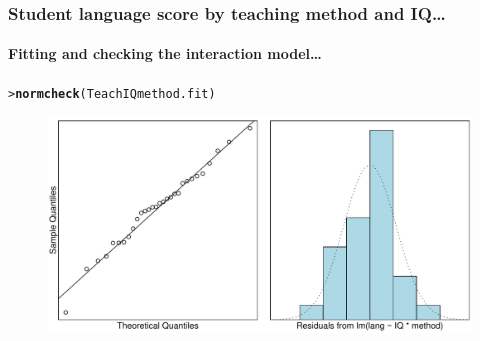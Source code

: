 \documentclass{beamer}\usepackage[]{graphicx}\usepackage[]{xcolor}
\makeatletter
\newcommand{\hlstd}[1]{\textcolor[rgb]{0.345,0.345,0.345}{#1}}%
\newcommand{\hlkwd}[1]{\textcolor[rgb]{0.737,0.353,0.396}{\textbf{#1}}}%
\newenvironment{kframe}{%
 \def\at@end@of@kframe{}%
 \ifinner\ifhmode%
  \def\at@end@of@kframe{\end{minipage}}%
  \begin{minipage}{\columnwidth}%
 \fi\fi%
 \def\FrameCommand##1{\hskip\@totalleftmargin \hskip-\fboxsep
 \colorbox{shadecolor}{##1}\hskip-\fboxsep
     \hskip-\linewidth \hskip-\@totalleftmargin \hskip\columnwidth}%
 \MakeFramed {\advance\hsize-\width
   \@totalleftmargin\z@ \linewidth\hsize
   \@setminipage}}%
 {\par\unskip\endMakeFramed%
 \at@end@of@kframe}
\newenvironment{knitrout}{}{} %
\makeatother
\begin{document}
\begin{frame}[fragile]
\frametitle{Student language score by  teaching method and IQ\ldots}
\framesubtitle{Fitting and checking the interaction model\ldots}
\begin{knitrout}\scriptsize
{}\color{fgcolor}\begin{kframe}
\begin{alltt}
\hlstd{> }\hlkwd{normcheck}\hlstd{(TeachIQmethod.fit)}
\end{alltt}
\end{kframe}
\end{knitrout}



\begin{figure}
  \centering
  \includegraphics[scale=0.5]{figure/RC-H09-011}
\end{figure}  

\end{frame}
\end{document}
